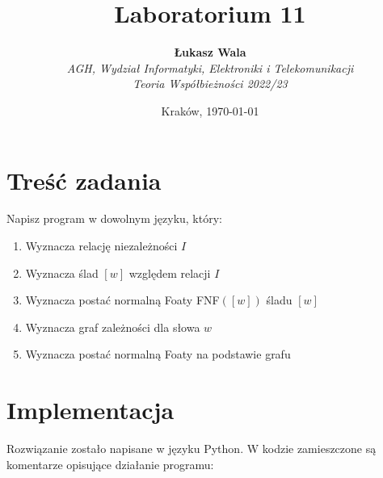 \documentclass{article}
\title{Laboratorium 11}
\author{\textbf{Łukasz Wala}\\
    \textit{AGH, Wydział Informatyki, Elektroniki i Telekomunikacji} \\
    \textit{Teoria Współbieżności 2022/23}}
\date{Kraków, \today}
\begin{document}
\maketitle

\section{Treść zadania}

Napisz program w dowolnym języku, który:
\begin{enumerate}
    \item Wyznacza relację niezależności $I$
    \item Wyznacza ślad $[w]$ względem relacji $I$
    \item Wyznacza postać normalną Foaty FNF$([w])$ śladu $[w]$
    \item Wyznacza graf zależności dla słowa $w$
    \item Wyznacza postać normalną Foaty na podstawie grafu
\end{enumerate}

\section{Implementacja}

Rozwiązanie zostało napisane w języku Python. W kodzie zamieszczone są komentarze
opisujące działanie programu:
\end{document}
